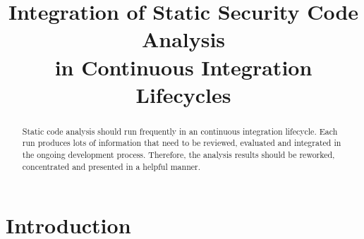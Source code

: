 \documentclass[conference]{IEEEtran}
\begin{document}
%
\title{Integration of Static Security Code Analysis\\in Continuous Integration Lifecycles}






\author{
	}








\maketitle


\begin{abstract}
\boldmath
Static code analysis should run frequently in an continuous integration lifecycle. Each run produces lots of information that need to be reviewed, evaluated and integrated in the ongoing development process. Therefore, the analysis results should be reworked, concentrated and presented in a helpful manner.
\end{abstract}


\IEEEpeerreviewmaketitle



\section{Introduction}
{}
\end{document}
